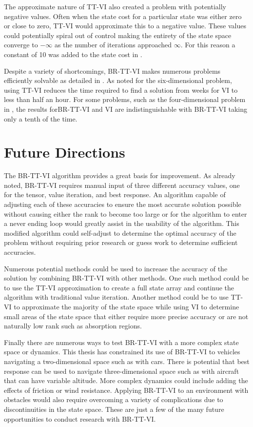 The approximate nature of TT-VI also created a problem with potentially negative values. Often when the state cost for a particular state was either zero or close to zero, TT-VI would approximate this to a negative value. These values could potentially spiral out of control making the entirety of the state space converge to $-\infty$ as the number of iterations approached $\infty$. For this reason a constant of 10 was added to the state cost in .

Despite a variety of shortcomings, BR-TT-VI makes numerous problems efficiently solvable as detailed in . As noted for the six-dimensional problem, using TT-VI reduces the time required to find a solution from weeks for VI to less than half an hour. For some problems, such as the four-dimensional problem in , the results forBR-TT-VI and VI are indistinguishable with BR-TT-VI taking only a tenth of the time.           

\section{Future Directions}
The BR-TT-VI algorithm provides a great basis for improvement. As already noted, BR-TT-VI requires manual input of three different accuracy values, one for the tensor, value iteration, and best response. An algorithm capable of adjusting each of these accuracies to ensure the most accurate solution possible without causing either the rank to become too large or for the algorithm to enter a never ending loop would greatly assist in the usability of the algorithm. This modified algorithm could self-adjust to determine the optimal accuracy of the problem without requiring prior research or guess work to determine sufficient accuracies.

Numerous potential methods could be used to increase the accuracy of the solution by combining BR-TT-VI with other methods. One such method could be to use the TT-VI approximation to create a full state array and continue the algorithm with traditional value iteration. Another method could be to use TT-VI to approximate the majority of the state space while using VI to determine small areas of the state space that either require more precise accuracy or are not naturally low rank such as absorption regions.

Finally there are numerous ways to test BR-TT-VI with a more complex state space or dynamics. This thesis has constrained its use of BR-TT-VI to vehicles navigating a two-dimensional space such as with cars. There is potential that best response can be used to navigate three-dimensional space such as with aircraft that can have variable altitude. More complex dynamics could include adding the effects of friction or wind resistance. Applying BR-TT-VI to an environment with obstacles would also require overcoming a variety of complications due to discontinuities in the state space. These are just a few of the many future opportunities to conduct research with BR-TT-VI.    


